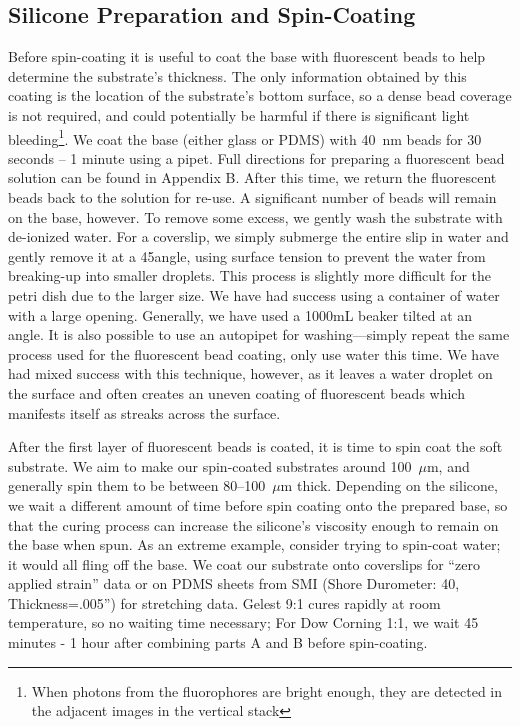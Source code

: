 \subsection{Silicone Preparation and Spin-Coating}
Before spin-coating it is useful to coat the base with fluorescent beads to help determine the substrate's thickness. The only information obtained by this coating is the location of the substrate's bottom surface, so a dense bead coverage is not required, and could potentially be harmful if there is significant light bleeding\footnote{When photons from the fluorophores are bright enough, they are detected in the adjacent images in the vertical stack}. We coat the base (either glass or PDMS) with 40~nm beads for 30 seconds -- 1 minute using a pipet. Full directions for preparing a fluorescent bead solution can be found in Appendix B. After this time, we return the fluorescent beads back to the solution for re-use. A significant number of beads will remain on the base, however. To remove some excess, we gently wash the substrate with de-ionized water. For a coverslip, we simply submerge the entire slip in water and gently remove it at a 45\degree angle, using surface tension to prevent the water from breaking-up into smaller droplets. This process is slightly more difficult for the petri dish due to the larger size. We have had success using a container of water with a large opening. Generally, we have used a 1000mL beaker tilted at an angle. It is also possible to use an autopipet for washing---simply repeat the same process used for the fluorescent bead coating, only use water this time. We have had mixed success with this technique, however, as it leaves a water droplet on the surface and often creates an uneven coating of fluorescent beads which manifests itself as streaks across the surface.

After the first layer of fluorescent beads is coated, it is time to spin coat the soft substrate. We aim to make our spin-coated substrates around 100~$\mu$m, and generally spin them to be between 80--100~$\mu$m thick. Depending on the silicone, we wait a different amount of time before spin coating onto the prepared base, so that the curing process can increase the silicone's viscosity enough to remain on the base when spun. As an extreme example, consider trying to spin-coat water; it would all fling off the base. We coat our substrate onto coverslips for ``zero applied strain'' data or on PDMS sheets from SMI (Shore Durometer: 40, Thickness=.005'') for stretching data. Gelest 9:1 cures rapidly at room temperature, so no waiting time necessary; For Dow Corning 1:1, we wait 45 minutes - 1 hour after combining parts A and B before spin-coating.

